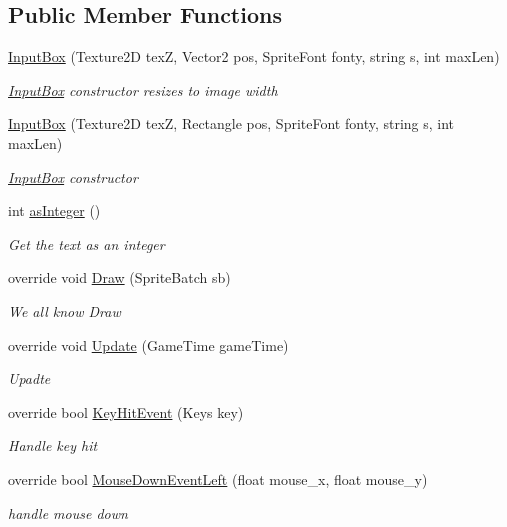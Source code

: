 \subsection*{Public Member Functions}
\begin{DoxyCompactItemize}
\item 
\mbox{\hyperlink{class_r_c___framework_1_1_input_box_ad692dce3ce7a7a99916b510aa88b9354}{Input\+Box}} (Texture2D texZ, Vector2 pos, Sprite\+Font fonty, string s, int max\+Len)
\begin{DoxyCompactList}\small\item\em \mbox{\hyperlink{class_r_c___framework_1_1_input_box}{Input\+Box}} constructor resizes to image width \end{DoxyCompactList}\item 
\mbox{\hyperlink{class_r_c___framework_1_1_input_box_ab33c6d6a73473a9067093deb2c95b865}{Input\+Box}} (Texture2D texZ, Rectangle pos, Sprite\+Font fonty, string s, int max\+Len)
\begin{DoxyCompactList}\small\item\em \mbox{\hyperlink{class_r_c___framework_1_1_input_box}{Input\+Box}} constructor \end{DoxyCompactList}\item 
int \mbox{\hyperlink{class_r_c___framework_1_1_input_box_a536e557732c8a9d599c8c5190410738f}{as\+Integer}} ()
\begin{DoxyCompactList}\small\item\em Get the text as an integer \end{DoxyCompactList}\item 
override void \mbox{\hyperlink{class_r_c___framework_1_1_input_box_ae5ee048852636d3675318a630cfc0ec6}{Draw}} (Sprite\+Batch sb)
\begin{DoxyCompactList}\small\item\em We all know Draw \end{DoxyCompactList}\item 
override void \mbox{\hyperlink{class_r_c___framework_1_1_input_box_ac91004a57916d0f9f55a40c007cb72ce}{Update}} (Game\+Time game\+Time)
\begin{DoxyCompactList}\small\item\em Upadte \end{DoxyCompactList}\item 
override bool \mbox{\hyperlink{class_r_c___framework_1_1_input_box_a07ef881a281e4da95994e54ec1f7b496}{Key\+Hit\+Event}} (Keys key)
\begin{DoxyCompactList}\small\item\em Handle key hit \end{DoxyCompactList}\item 
override bool \mbox{\hyperlink{class_r_c___framework_1_1_input_box_a7e57c860483df9645d726d6adbbc6dab}{Mouse\+Down\+Event\+Left}} (float mouse\+\_\+x, float mouse\+\_\+y)
\begin{DoxyCompactList}\small\item\em handle mouse down \end{DoxyCompactList}\end{DoxyCompactItemize}
